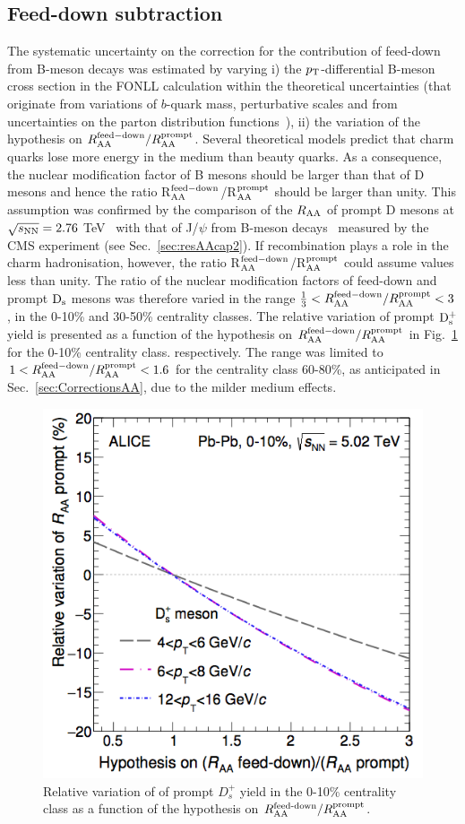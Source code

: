 \subsection{Feed-down subtraction}
\label{sec:FDsystAA}
The systematic uncertainty on the correction for the contribution of feed-down from 
B-meson decays was estimated by varying i)
the $p_{\rm T}$-differential B-meson cross section in the 
FONLL calculation within the theoretical uncertainties (that originate from variations of 
$b$-quark mass, perturbative scales and from uncertainties on the parton distribution functions~\cite{Cacciari:2012ny}), 
ii) the variation of the hypothesis on $R_{\rm AA}^{\rm  feed-down}/R_{\rm AA}^{\rm prompt} $. 
Several theoretical models predict that charm quarks lose more energy 
in the medium than beauty quarks. As a consequence, the nuclear modification 
factor of B mesons should be larger than that of D mesons and hence the ratio 
R$^{\rm feed-down}_{\rm AA}$/R$^{\rm prompt}_{\rm AA}$ should be larger than unity. 
This assumption was confirmed by the comparison of the $R_{\rm AA}$ of prompt D mesons at 
$\sqrt{s_{\rm NN}} = 2.76$ TeV~\cite{Adam:2015nna} with that of J/$\psi$ from B-meson decays~\cite{Khachatryan:2016ypw} 
measured by the CMS experiment (see Sec.~\ref{sec:resAAcap2}).
If recombination plays a role in the charm hadronisation, however,  
the ratio R$^{\rm feed-down}_{\rm AA}$/R$^{\rm prompt}_{\rm AA} $ could assume values 
less than unity. The ratio of the nuclear modification factors of feed-down and 
prompt ${\rm D_s}$ mesons was therefore varied in the range 
$\frac{1}{3} < R_{\rm AA}^{\rm  feed-down}/R_{\rm AA}^{\rm prompt} < 3$, in 
the 0-10\% and 30-50\% centrality classes.
The relative variation of prompt ${\rm D_s^+}$ yield is presented as a function of the hypothesis on  
$R_{\rm AA}^{\rm  feed-down}/R_{\rm AA}^{\rm prompt}$ in Fig.~\ref{fig:promptAA}
for the 0-10\% centrality class. 
respectively. The range was limited to 
$1 < R_{\rm AA}^{\rm  feed-down} / R_{\rm AA}^{\rm prompt} < 1.6$ 
for the centrality class 60-80\%, as anticipated in Sec.~\ref{sec:CorrectionsAA},
due to the milder medium effects.
\begin{figure}[!h]
 \begin{center}
\includegraphics[width=.49\textwidth]{./FigCap5/RaaVariationVsRbHypo.png}
\end{center}
 \caption{Relative variation of of prompt $D^+_s$ yield in the 0-10\% centrality class as a function of the hypothesis on $R_{\rm AA}^{\textnormal{feed-down}}/R_{\rm AA}^{\rm prompt}$.}
 \label{fig:promptAA}
\end{figure}


